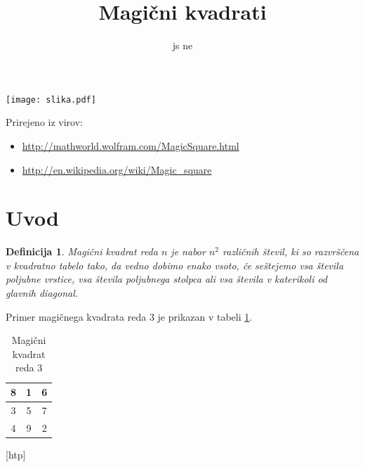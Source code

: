\documentclass[a4paper,12pt]{article}
\title{Magični kvadrati}
\date{}
\author{js ne}
\newtheorem{definicija}[izrek]{Definicija}
\begin{document}
\maketitle

\begin{center}
   \texttt{[image: slika.pdf]}
\end{center}

Prirejeno iz virov:

\begin{itemize}
   \item \url{http://mathworld.wolfram.com/MagicSquare.html}
   \item \url{http://en.wikipedia.org/wiki/Magic_square}
\end{itemize}

\newpage
\tableofcontents

\newpage

\section{Uvod}

\begin{definicija}
   \emph{Magični kvadrat} reda $n$ je nabor $n^2$ različnih števil,
   ki so razvrščena v kvadratno tabelo tako, da vedno dobimo enako vsoto,
   če seštejemo vsa števila poljubne vrstice, vsa števila poljubnega
   stolpca ali vsa števila v katerikoli od glavnih diagonal.
\end{definicija}

Primer magičnega kvadrata reda 3 je prikazan v tabeli \ref{table:mag3}.

\begin{table}[ht!]
   \centering
   \caption{Magični kvadrat reda 3}
   \begin{tabular}{|c|c|c|}\hline
      8 & 1 & 6 \\\hline
      3 & 5 & 7 \\\hline
      4 & 9 & 2 \\\hline
   \end{tabular}
   \label{table:mag3}
\end{table}[htp]
\end{document}
